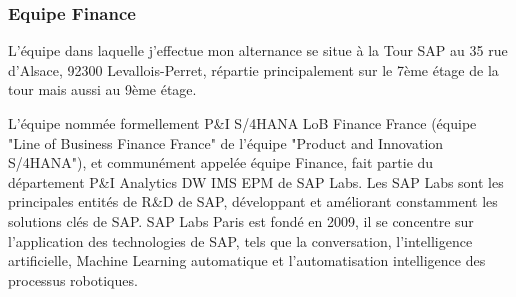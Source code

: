 %    
%        
    
    \subsubsection{Equipe Finance}
        L'équipe dans laquelle j'effectue mon alternance se situe à la Tour SAP au 35 rue d'Alsace, 92300 Levallois-Perret, répartie principalement sur le 7ème étage de la tour mais aussi au 9ème étage.
        
        \par L'équipe nommée formellement P\&I S/4HANA LoB Finance France (équipe "Line of Business Finance France" de l’équipe "Product and Innovation S/4HANA"), et communément appelée équipe Finance, fait partie du département P\&I Analytics DW IMS EPM de SAP Labs.  Les SAP Labs sont les principales entités de R\&D de SAP, développant et améliorant constamment les solutions clés de SAP. SAP Labs Paris est fondé en 2009, il se concentre sur l'application des technologies de SAP, tels que la conversation, l'intelligence artificielle, Machine Learning automatique et l'automatisation intelligence des processus robotiques.
        
